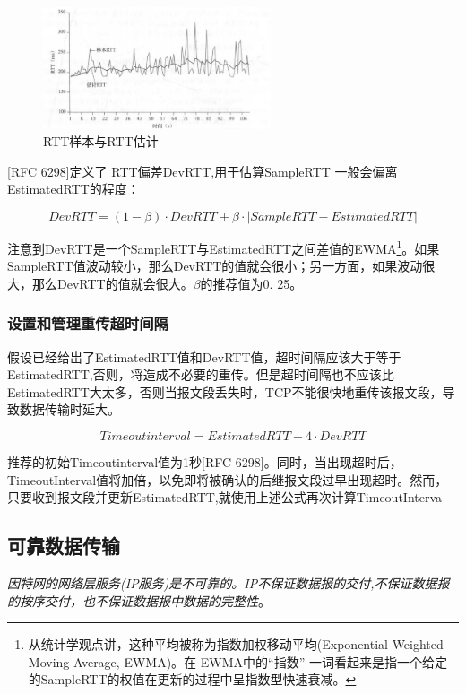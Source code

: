 \begin{figure}[!htbp]
    \centering
    \includegraphics[width=0.6\textwidth]{image/chapter03/RTT样本与RTT估计.png}
    \caption{RTT样本与RTT估计}
\end{figure}

    [RFC 6298]定义了 RTT偏差DevRTT,用于估算SampleRTT 一般会偏离EstimatedRTT的程度：

$$
    DevRTT = (1 - \beta) \cdot DevRTT + \beta \cdot | SampleRTT - EstimatedRTT |
$$

    注意到DevRTT是一个SampleRTT与EstimatedRTT之间差值的EWMA\footnote[1]{从统计学观点讲，这种平均被称为指数加权移动平均(Exponential Weighted Moving Average, EWMA)。在 EWMA中的“指数” 一词看起来是指一个给定的SampleRTT的权值在更新的过程中呈指数型快速衰减。}。如果SampleRTT值波动较小，那么DevRTT的值就会很小；另一方面，如果波动很大，那么DevRTT的值就会很大。$\beta$的推荐值为0. 25。

\subsubsection{设置和管理重传超时间隔}

    假设已经给岀了EstimatedRTT值和DevRTT值，超时间隔应该大于等于EstimatedRTT,否则，将造成不必要的重传。但是超时间隔也不应该比EstimatedRTT大太多，否则当报文段丢失时，TCP不能很快地重传该报文段，导致数据传输时延大。

$$
    Timeoutinterval = EstimatedRTT + 4 \cdot DevRTT
$$

    推荐的初始Timeoutinterval值为1秒[RFC 6298]。同时，当出现超时后，TimeoutInterval值将加倍，以免即将被确认的后继报文段过早出现超时。然而，只要收到报文段并更新EstimatedRTT,就使用上述公式再次计算TimeoutInterva

\subsection{可靠数据传输}

    \emph{因特网的网络层服务(IP服务)是不可靠的。IP不保证数据报的交付,不保证数据报的按序交付，也不保证数据报中数据的完整性}。

